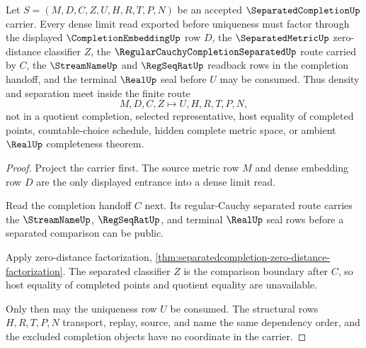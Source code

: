 \begin{theorem}
\label{thm:separated-completion-density-separated-route}
Let $S=(M,D,C,Z,U,H,R,T,P,N)$ be an accepted $\SeparatedCompletionUp$ carrier. Every dense limit read exported before uniqueness must factor through the displayed $\CompletionEmbeddingUp$ row $D$, the $\SeparatedMetricUp$ zero-distance classifier $Z$, the $\RegularCauchyCompletionSeparatedUp$ route carried by $C$, the $\StreamNameUp$ and $\RegSeqRatUp$ readback rows in the completion handoff, and the terminal $\RealUp$ seal before $U$ may be consumed. Thus density and separation meet inside the finite route
$$
M,D,C,Z \longmapsto U,H,R,T,P,N ,
$$
not in a quotient completion, selected representative, host equality of completed points, countable-choice schedule, hidden complete metric space, or ambient $\RealUp$ completeness theorem.
\end{theorem}
\begin{proof}
Project the carrier first. The source metric row $M$ and dense embedding row $D$ are the only displayed entrance into a dense limit read.

Read the completion handoff $C$ next. Its regular-Cauchy separated route carries the $\StreamNameUp$, $\RegSeqRatUp$, and terminal $\RealUp$ seal rows before a separated comparison can be public.

Apply zero-distance factorization, \autoref{thm:separatedcompletion-zero-distance-factorization}. The separated classifier $Z$ is the comparison boundary after $C$, so host equality of completed points and quotient equality are unavailable.

Only then may the uniqueness row $U$ be consumed. The structural rows $H,R,T,P,N$ transport, replay, source, and name the same dependency order, and the excluded completion objects have no coordinate in the carrier.
\end{proof}

